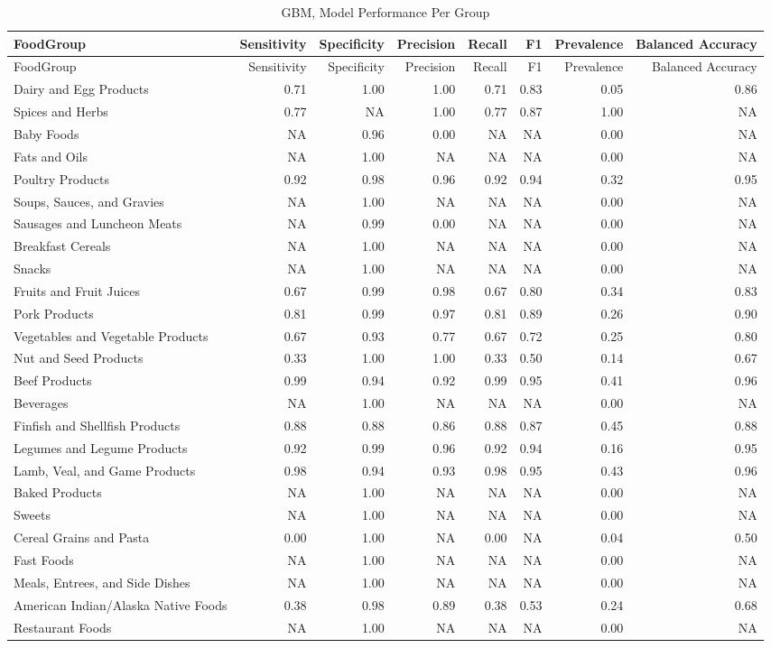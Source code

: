 \documentclass[]{article}
\begin{document}
\begin{longtable}[]{@{}lrrrrrrr@{}}
\caption{GBM, Model Performance Per Group}\tabularnewline
\toprule
FoodGroup & Sensitivity & Specificity & Precision & Recall & F1 &
Prevalence & Balanced Accuracy\tabularnewline
\midrule
\endfirsthead
\toprule
FoodGroup & Sensitivity & Specificity & Precision & Recall & F1 &
Prevalence & Balanced Accuracy\tabularnewline
\midrule
\endhead
Dairy and Egg Products & 0.71 & 1.00 & 1.00 & 0.71 & 0.83 & 0.05 &
0.86\tabularnewline
Spices and Herbs & 0.77 & NA & 1.00 & 0.77 & 0.87 & 1.00 &
NA\tabularnewline
Baby Foods & NA & 0.96 & 0.00 & NA & NA & 0.00 & NA\tabularnewline
Fats and Oils & NA & 1.00 & NA & NA & NA & 0.00 & NA\tabularnewline
Poultry Products & 0.92 & 0.98 & 0.96 & 0.92 & 0.94 & 0.32 &
0.95\tabularnewline
Soups, Sauces, and Gravies & NA & 1.00 & NA & NA & NA & 0.00 &
NA\tabularnewline
Sausages and Luncheon Meats & NA & 0.99 & 0.00 & NA & NA & 0.00 &
NA\tabularnewline
Breakfast Cereals & NA & 1.00 & NA & NA & NA & 0.00 & NA\tabularnewline
Snacks & NA & 1.00 & NA & NA & NA & 0.00 & NA\tabularnewline
Fruits and Fruit Juices & 0.67 & 0.99 & 0.98 & 0.67 & 0.80 & 0.34 &
0.83\tabularnewline
Pork Products & 0.81 & 0.99 & 0.97 & 0.81 & 0.89 & 0.26 &
0.90\tabularnewline
Vegetables and Vegetable Products & 0.67 & 0.93 & 0.77 & 0.67 & 0.72 &
0.25 & 0.80\tabularnewline
Nut and Seed Products & 0.33 & 1.00 & 1.00 & 0.33 & 0.50 & 0.14 &
0.67\tabularnewline
Beef Products & 0.99 & 0.94 & 0.92 & 0.99 & 0.95 & 0.41 &
0.96\tabularnewline
Beverages & NA & 1.00 & NA & NA & NA & 0.00 & NA\tabularnewline
Finfish and Shellfish Products & 0.88 & 0.88 & 0.86 & 0.88 & 0.87 & 0.45
& 0.88\tabularnewline
Legumes and Legume Products & 0.92 & 0.99 & 0.96 & 0.92 & 0.94 & 0.16 &
0.95\tabularnewline
Lamb, Veal, and Game Products & 0.98 & 0.94 & 0.93 & 0.98 & 0.95 & 0.43
& 0.96\tabularnewline
Baked Products & NA & 1.00 & NA & NA & NA & 0.00 & NA\tabularnewline
Sweets & NA & 1.00 & NA & NA & NA & 0.00 & NA\tabularnewline
Cereal Grains and Pasta & 0.00 & 1.00 & NA & 0.00 & NA & 0.04 &
0.50\tabularnewline
Fast Foods & NA & 1.00 & NA & NA & NA & 0.00 & NA\tabularnewline
Meals, Entrees, and Side Dishes & NA & 1.00 & NA & NA & NA & 0.00 &
NA\tabularnewline
American Indian/Alaska Native Foods & 0.38 & 0.98 & 0.89 & 0.38 & 0.53 &
0.24 & 0.68\tabularnewline
Restaurant Foods & NA & 1.00 & NA & NA & NA & 0.00 & NA\tabularnewline
\bottomrule
\end{longtable}
\end{document}

